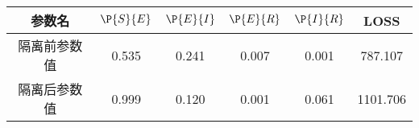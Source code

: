 \begin{tabular}{cccccc}
\hline
参数名&$\P{S}{E}$&$\P{E}{I}$&$\P{E}{R}$&$\P{I}{R}$&LOSS\\
\hline
隔离前参数值&0.535&0.241&0.007&0.001&787.107\\
隔离后参数值&0.999&0.120&0.001&0.061&1101.706\\
\hline
\end{tabular}